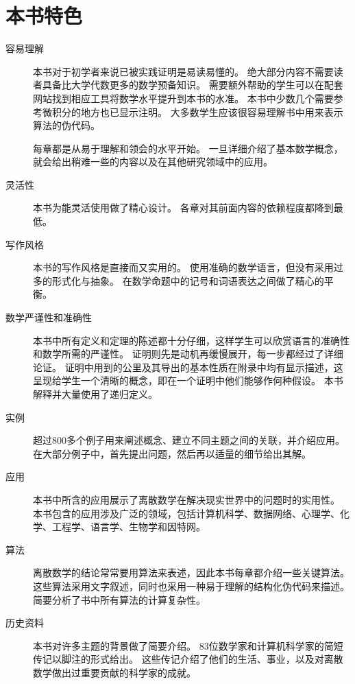 {    \section{本书特色}
    {
        \begin{description}
            \item[容易理解]
            {
                本书对于初学者来说已被实践证明是易读易懂的。
                绝大部分内容不需要读者具备比大学代数更多的数学预备知识。
                需要额外帮助的学生可以在配套网站找到相应工具将数学水平提升到本书的水准。
                本书中少数几个需要参考微积分的地方也已显示注明。
                大多数学生应该很容易理解书中用来表示算法的伪代码。

                每章都是从易于理解和领会的水平开始。
                一旦详细介绍了基本数学概念，就会给出稍难一些的内容以及在其他研究领域中的应用。
            }
            \item[灵活性]
            {
                本书为能灵活使用做了精心设计。
                各章对其前面内容的依赖程度都降到最低。
            }
            \item[写作风格]
            {
                本书的写作风格是直接而又实用的。
                使用准确的数学语言，但没有采用过多的形式化与抽象。
                在数学命题中的记号和词语表达之间做了精心的平衡。
            }
            \item[数学严谨性和准确性]
            {
                本书中所有定义和定理的陈述都十分仔细，这样学生可以欣赏语言的准确性和数学所需的严谨性。
                证明则先是动机再缓慢展开，每一步都经过了详细论证。
                证明中用到的公里及其导出的基本性质在附录中均有显示描述，这呈现给学生一个清晰的概念，即在一个证明中他们能够作何种假设。
                本书解释并大量使用了递归定义。
            }
            \item[实例]
            {
                超过800多个例子用来阐述概念、建立不同主题之间的关联，并介绍应用。
                在大部分例子中，首先提出问题，然后再以适量的细节给出其解。
            }
            \item[应用]
            {
                本书中所含的应用展示了离散数学在解决现实世界中的问题时的实用性。
                本书包含的应用涉及广泛的领域，包括计算机科学、数据网络、心理学、化学、工程学、语言学、生物学和因特网。
            }
            \item[算法]
            {
                离散数学的结论常常要用算法来表述，因此本书每章都介绍一些关键算法。
                这些算法采用文字叙述，同时也采用一种易于理解的结构化伪代码来描述。
                简要分析了书中所有算法的计算复杂性。
            }
            \item[历史资料]
            {
                本书对许多主题的背景做了简要介绍。
                83位数学家和计算机科学家的简短传记以脚注的形式给出。
                这些传记介绍了他们的生活、事业，以及对离散数学做出过重要贡献的科学家的成就。

}
\end{description}}}
